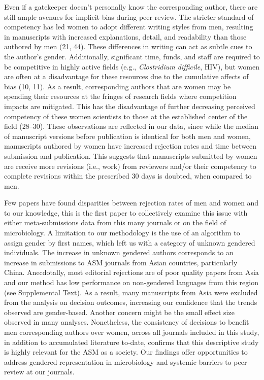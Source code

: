 \documentclass[11pt,]{article}
\begin{document}
Even if a gatekeeper doesn't personally know the corresponding author,
there are still ample avenues for implicit bias during peer review. The
stricter standard of competency has led women to adopt different writing
styles from men, resulting in manuscripts with increased explanations,
detail, and readability than those authored by men (21, 44). These
differences in writing can act as subtle cues to the author's gender.
Additionally, significant time, funds, and staff are required to be
competitive in highly active fields (e.g., \emph{Clostridium difficile},
HIV), but women are often at a disadvantage for these resources due to
the cumulative affects of bias (10, 11). As a result, corresponding
authors that are women may be spending their resources at the fringes of
research fields where competition impacts are mitigated. This has the
disadvantage of further decreasing perceived competency of these women
scientists to those at the established center of the field (28--30).
These observations are reflected in our data, since while the median of
manuscript versions before publication is identical for both men and
women, manuscripts authored by women have increased rejection rates and
time between submission and publication. This suggests that manuscripts
submitted by women are receive more revisions (i.e., work) from
reviewers and/or their competency to complete revisions within the
prescribed 30 days is doubted, when compared to men.

Few papers have found disparities between rejection rates of men and
women and to our knowledge, this is the first paper to collectively
examine this issue with either meta-submissions data from this many
journals or on the field of microbiology. A limitation to our
methodology is the use of an algorithm to assign gender by first names,
which left us with a category of unknown gendered individuals. The
increase in unknown gendered authors corresponds to an increase in
submissions to ASM journals from Asian countries, particularly China.
Anecdotally, most editorial rejections are of poor quality papers from
Asia and our method has low performance on non-gendered languages from
this region (see Supplemental Text). As a result, many manuscripts from
Asia were excluded from the analysis on decision outcomes, increasing
our confidence that the trends observed are gender-based. Another
concern might be the small effect size observed in many analyses.
Nonetheless, the consistency of decisions to benefit men corresponding
authors over women, across all journals included in this study, in
addition to accumulated literature to-date, confirms that this
descriptive study is highly relevant for the ASM as a society. Our
findings offer opportunities to address gendered representation in
microbiology and systemic barriers to peer review at our journals.
\end{document}
